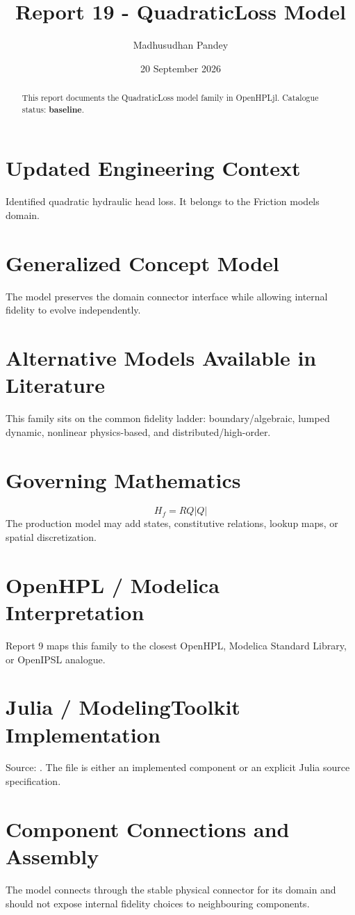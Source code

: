 \documentclass[10pt,a4paper]{article}
\title{Report 19 - QuadraticLoss Model}
\author{Madhusudhan Pandey}
\date{20 September 2026}
\begin{document}
\maketitle
\begin{abstract}This report documents the QuadraticLoss model family in OpenHPLjl. Catalogue status: \textbf{baseline}.\end{abstract}
\section{Updated Engineering Context}Identified quadratic hydraulic head loss. It belongs to the Friction models domain.
\section{Generalized Concept Model}The model preserves the domain connector interface while allowing internal fidelity to evolve independently.
\section{Alternative Models Available in Literature}This family sits on the common fidelity ladder: boundary/algebraic, lumped dynamic, nonlinear physics-based, and distributed/high-order.
\section{Governing Mathematics}\[H_f=R Q|Q|\]The production model may add states, constitutive relations, lookup maps, or spatial discretization.
\section{OpenHPL / Modelica Interpretation}Report 9 maps this family to the closest OpenHPL, Modelica Standard Library, or OpenIPSL analogue.
\section{Julia / ModelingToolkit Implementation}Source: \texttt{}. The file is either an implemented component or an explicit Julia source specification.
\section{Component Connections and Assembly}The model connects through the stable physical connector for its domain and should not expose internal fidelity choices to neighbouring components.
\end{document}
